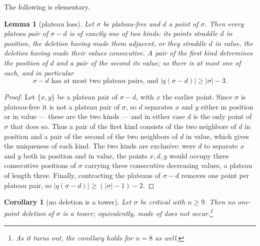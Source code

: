\documentclass[12pt]{article}
\newtheorem{lemma}[lemma]{Lemma}
\newtheorem{corollary}[corollary]{Corollary}
\theoremstyle{definition}
\begin{document}
The following is elementary.
\begin{lemma}[plateau loss]\label{lem:plateaubound}
Let $\sigma$ be plateau-free and $d$ a point of $\sigma$. Then every
plateau pair of $\sigma - d$ is of exactly one of two kinds: its points
straddle $d$ in position, the deletion having made them adjacent, or they
straddle $d$ in value, the deletion having made their values consecutive.
A pair of the first kind determines the position of $d$ and a pair of the
second its value; so there is at most one of each, and in particular
\begin{equation}\label{eq:plateaubound}
   \sigma - d \text{ has at most two plateau pairs, and }
   |q(\sigma - d)| \ge |\sigma| - 3 .
\end{equation}
\end{lemma}

\begin{proof}
Let $\{x,y\}$ be a plateau pair of $\sigma - d$, with $x$ the earlier
point. Since $\sigma$ is plateau-free it is not a plateau pair of
$\sigma$, so $d$ separates $x$ and $y$ either in position or in value ---
these are the two kinds --- and in either case $d$ is the only point of
$\sigma$ that does so. Thus a pair of the first kind consists of the two
neighbors of $d$ in position and a pair of the second of the two
neighbors of $d$ in value, which gives the uniqueness of each kind. The
two kinds are exclusive: were $d$ to separate $x$ and $y$ both in
position and in value, the points $x,d,y$ would occupy three consecutive
positions of $\sigma$ carrying three consecutive decreasing values,
a plateau of length three. Finally, contracting the plateaus of
$\sigma-d$ removes one point per plateau pair, so $|q(\sigma - d)| \ge
(|\sigma|-1) - 2$.
\end{proof}



\begin{corollary}[no deletion is a tower]\label{cor:notower}
Let $\sigma$ be critical with $n \ge 9$. Then no one-point deletion of
$\sigma$ is a tower; equivalently, mode  of
 does not occur.\footnote{As it turns out, the corollary holds for $n=8$ as well.}
\end{corollary}
\end{document}
